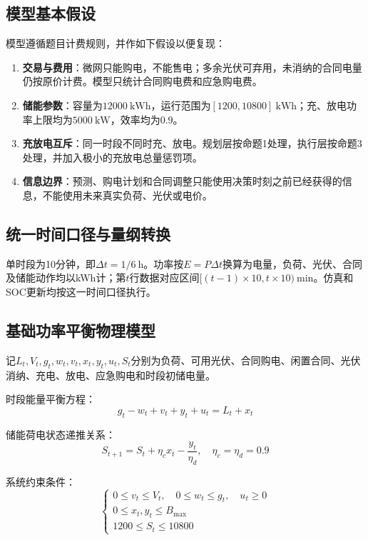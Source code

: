 
\subsection{模型基本假设}
模型遵循题目计费规则，并作如下假设以便复现：

\begin{enumerate}
    \item \textbf{交易与费用}：微网只能购电，不能售电；多余光伏可弃用，未消纳的合同电量仍按原价计费。模型只统计合同购电费和应急购电费。
    \item \textbf{储能参数}：容量为$12000\ \mathrm{kWh}$，运行范围为$[1200,10800]\ \mathrm{kWh}$；充、放电功率上限均为$5000\ \mathrm{kW}$，效率均为$0.9$。
    \item \textbf{充放电互斥}：同一时段不同时充、放电。规划层按命题1处理，执行层按命题3处理，并加入极小的充放电总量惩罚项。
    \item \textbf{信息边界}：预测、购电计划和合同调整只能使用决策时刻之前已经获得的信息，不能使用未来真实负荷、光伏或电价。
\end{enumerate}

\subsection{统一时间口径与量纲转换}
单时段为10分钟，即$\Delta t=1/6\ \mathrm{h}$。功率按$E=P\Delta t$换算为电量，负荷、光伏、合同及储能动作均以kWh计；第$t$行数据对应区间$[(t-1)\times10,t\times10)\ \mathrm{min}$。仿真和SOC更新均按这一时间口径执行。

\subsection{基础功率平衡物理模型}
记$L_t,V_t,g_t,w_t,v_t,x_t,y_t,u_t,S_t$分别为负荷、可用光伏、合同购电、闲置合同、光伏消纳、充电、放电、应急购电和时段初储电量。

时段能量平衡方程：
\[
g_t - w_t + v_t + y_t + u_t = L_t + x_t
\]

储能荷电状态递推关系：
\[
S_{t+1}=S_t+\eta_c x_t-\dfrac{y_t}{\eta_d},\quad \eta_c=\eta_d=0.9
\]

系统约束条件：
\[
\begin{cases}
0\le v_t \le V_t,\quad 0\le w_t \le g_t,\quad u_t \ge 0\\
0\le x_t,y_t \le B_{\max}\\
1200 \le S_t \le 10800
\end{cases}
\]

